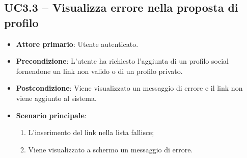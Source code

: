 \subsection{UC3.3 – Visualizza errore nella proposta di profilo}
\begin{itemize}
    \item \textbf{Attore primario}: Utente autenticato.
    \item \textbf{Precondizione}: L’utente ha richiesto l’aggiunta di un profilo social fornendone un link non valido o di un profilo privato.
    \item \textbf{Postcondizione}: Viene visualizzato un messaggio di errore e il link non viene aggiunto al sistema.
    \item \textbf{Scenario principale}: 
    \begin{enumerate}
        \item L'inserimento del link nella lista fallisce;
        \item Viene visualizzato a schermo un messaggio di errore.
    \end{enumerate}
\end{itemize}

